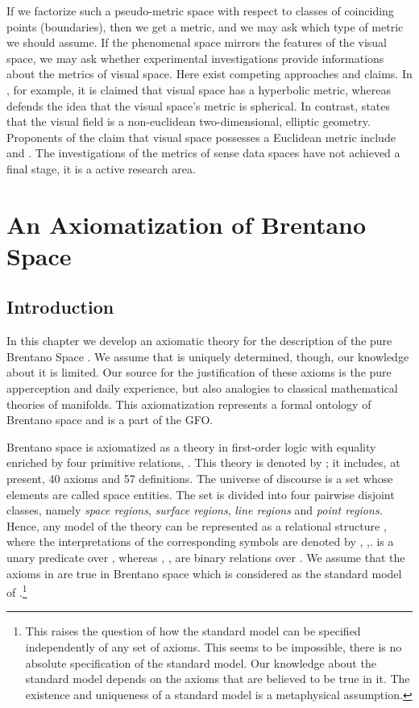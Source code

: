 \documentclass{ao2e}
\begin{document}
{If we factorize such a pseudo-metric space with respect to classes of coinciding points (boundaries), then we get a metric, and we may ask which type of metric we should assume. If the phenomenal space mirrors the features of the visual space, we may ask whether experimental investigations provide informations about the metrics of visual space. Here exist competing approaches and claims. In \cite{luneburg-r-1950-a}, for example, it is claimed that visual space has a hyperbolic metric, whereas \cite{french-r-1987-a} defends the idea that the visual space's metric 
is spherical. In contrast, \cite{angell-rb-1974-a} states that the visual field is a non-euclidean two-dimensional, elliptic geometry. Proponents of the claim that visual space possesses a Euclidean metric include \cite{kant-i-1998-a} and \cite{strawson-pf-1966-a}. The investigations of the metrics of sense data spaces have not achieved a final stage, it is a active research area.   
 
  




\section{An Axiomatization of Brentano Space}  
\subsection{Introduction}
In this chapter we develop an axiomatic theory for the description of the pure Brentano Space .
We assume that  is uniquely determined, though, our knowledge about it is limited. Our source for the justification of these axioms is the pure apperception and daily experience, but also analogies to
classical mathematical theories of manifolds. This axiomatization represents a formal ontology of Brentano space and is a part of the GFO.

Brentano space  is axiomatized as a theory in first-order logic with equality
enriched by four primitive relations,    . This theory is denoted by ; it includes, at present, 40 axioms and 57 definitions. The universe of discourse is a set  whose elements are called space entities. The set  is divided into four pairwise disjoint classes, namely \textit{space regions}, \textit{surface regions}, \textit{line regions} and \textit{point regions}. Hence, any model  of
the theory  can be represented as a relational structure      , where the interpretations of the corresponding symbols    are denoted by  , ,.  is a unary predicate over
, whereas , ,  are binary relations over . We assume that
the axioms in  are true in Brentano space  which is considered as the standard model
of .\footnote{This raises the question of how the standard model can be specified independently of any set
of axioms. This seems to be impossible, there is no absolute specification of the standard model. Our knowledge about the standard model depends on the axioms that are believed to be true in it. The existence and uniqueness of
a standard model is a metaphysical assumption.}

}
\end{document}
